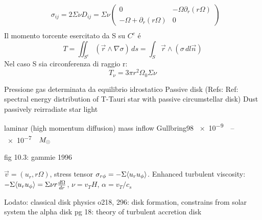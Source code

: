 \begin{workout}
	
\end{workout}

\begin{workout}
	\begin{align}
		&\sigma_{ij}=2\Sigma\nu D_{ij}=\Sigma\nu\begin{pmatrix}0&-\Omega\partial_r(r\Omega)\\-\Omega+\partial_r(r\Omega)&0
		\end{pmatrix}\\
	\end{align}
	Il momento torcente esercitato da S su $C^c$ \'e
	\begin{equation}
	T=\iint_{S^c}(\vec{r}\wedge\nabla\sigma)\,ds=\int_S\vec{r}\wedge(\sigma\,dl\vec{n})
	\end{equation}
	Nel caso S sia circonferenza di raggio r:
	\begin{equation}
	T_{\nu}=3\pi r^2\Omega_0\Sigma\nu
	\end{equation}
\end{workout}

\begin{workout}
	Pressione gas determinata da equilibrio idrostatico
	Passive disk (Refs: Ref: spectral energy distribution of T-Tauri star with passive circumstellar disk)	Dust passively reirradiate star light
\end{workout}

\begin{workout}
	laminar (high momentum diffusion)
	mass inflow Gullbring98 \SIrange{e-9}{e-7}{\per\year}$M_{\odot}{}$
\end{workout}
\begin{workout}[MRI]
	fig 10.3:
	gammie 1996
\end{workout}

\begin{workout}
	$\vec{v}=(u_r,r\Omega)$, stress tensor $\sigma_{r\phi}=-\Sigma\langle u_ru_{\phi} \rangle$.
	Enhanced turbulent viscosity: $-\Sigma\langle u_ru_{\phi} \rangle=\Sigma\nu r\frac{d \Omega}{d r}$, $\nu=v_TH$, $\alpha=v_T/c_s$
\end{workout}

\begin{workout}
	Lodato: classical disk physics
	o218, 296: disk formation, constrains from solar system
	the alpha disk pg 18: theory of turbulent accretion disk
\end{workout}


